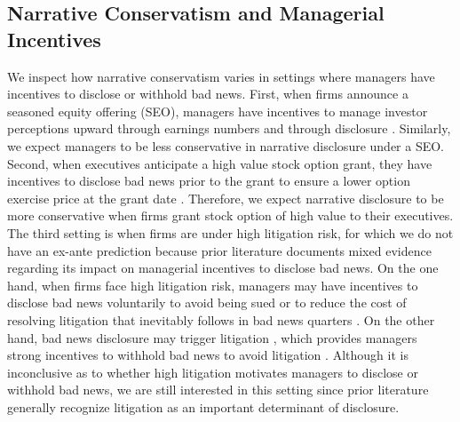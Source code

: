 \documentclass[letterpaper,11pt]{article}
\begin{document}
\begin{spacing}{1.5}
\subsection{Narrative Conservatism and Managerial Incentives}
\noindent We inspect how narrative conservatism varies in settings where managers have incentives to disclose or withhold bad news. First, when firms announce a seasoned equity offering (SEO), managers have incentives to manage investor perceptions upward through earnings numbers \cite{teohEarningsManagementUnderperformance1998} and through disclosure \cite{langVoluntaryDisclosureEquity2000}. Similarly, we expect managers to be less conservative in narrative disclosure under a SEO. Second, when executives anticipate a high value stock option grant, they have incentives to disclose bad news prior to the grant to ensure a lower option exercise price at the grant date \cite{aboodyCEOStockOption2000,bakerStockOptionCompensation2003,mcanallyExecutiveStockOptions2008}. Therefore, we expect narrative disclosure to be more conservative when firms grant stock option of high value to their executives. The third setting is when firms are under high litigation risk, for which we do not have an ex-ante prediction because prior literature documents mixed evidence regarding its impact on managerial incentives to disclose bad news. On the one hand, when firms face high litigation risk, managers may have incentives to disclose bad news voluntarily to avoid being sued or to reduce the cost of resolving litigation that inevitably follows in bad news quarters \cite{skinnerWhyFirmsVoluntarily1994, skinnerEarningsDisclosuresStockholder1997}. On the other hand, bad news disclosure may trigger litigation \cite{francisShareholderLitigationCorporate1994}, which provides managers strong incentives to withhold bad news to avoid litigation \cite{rogersShareholderLitigationChanges2009}. Although it is inconclusive as to whether high litigation motivates managers to disclose or withhold bad news, we are still interested in this setting since prior literature generally recognize litigation as an important determinant of disclosure.


\end{spacing}
\end{document}
